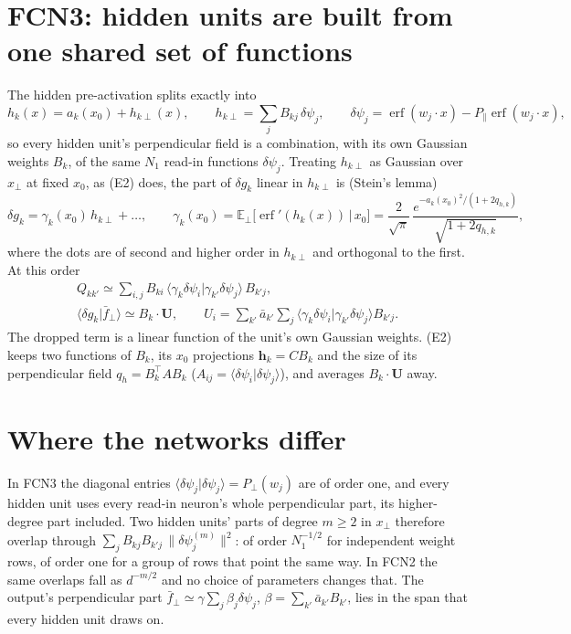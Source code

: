 \documentclass[11pt,a4paper]{article}
\newcommand{\E}{\mathbb E}
\newcommand{\erf}{\operatorname{erf}}
\begin{document}
\section*{FCN3: hidden units are built from one shared set of functions}

The hidden pre-activation splits exactly into
\begin{equation}
  h_k(x)=a_k(x_0)+h_{k\perp}(x),\qquad h_{k\perp}=\sum_jB_{kj}\,\delta\psi_j,\qquad
  \delta\psi_j=\erf(w_j\cdot x)-P_\parallel\erf(w_j\cdot x),
\end{equation}
so every hidden unit's perpendicular field is a combination, with its own Gaussian weights $B_k$, of the same $N_1$
read-in functions $\delta\psi_j$. Treating $h_{k\perp}$ as Gaussian over $x_\perp$ at fixed $x_0$, as (E2) does, the part
of $\delta g_k$ linear in $h_{k\perp}$ is (Stein's lemma)
\begin{equation}
  \delta g_k=\gamma_k(x_0)\,h_{k\perp}+\dots,\qquad
  \gamma_k(x_0)=\E_\perp\big[\erf'(h_k(x))\,\big|\,x_0\big]
  =\frac{2}{\sqrt\pi}\,\frac{e^{-a_k(x_0)^2/(1+2q_{h,k})}}{\sqrt{1+2q_{h,k}}},
\end{equation}
where the dots are of second and higher order in $h_{k\perp}$ and orthogonal to the first. At this order
\begin{gather}
  Q_{kk'}\simeq\sum_{i,j}B_{ki}\,\big\langle\gamma_k\delta\psi_i\big|\gamma_{k'}\delta\psi_j\big\rangle\,B_{k'j},\\
  \big\langle\delta g_k\big|\bar f_\perp\big\rangle\simeq B_k\cdot\mathbf U,\qquad
  U_i=\sum_{k'}\bar a_{k'}\sum_j\big\langle\gamma_k\delta\psi_i\big|\gamma_{k'}\delta\psi_j\big\rangle B_{k'j}.
\end{gather}
The dropped term is a linear function of the unit's own Gaussian weights. (E2) keeps two functions of $B_k$, its
$x_0$ projections $\mathbf h_k=CB_k$ and the size of its perpendicular field $q_h=B_k^\top AB_k$
($A_{ij}=\langle\delta\psi_i|\delta\psi_j\rangle$), and averages $B_k\cdot\mathbf U$ away.

\section*{Where the networks differ}

In FCN3 the diagonal entries $\langle\delta\psi_j|\delta\psi_j\rangle=P_\perp(w_j)$ are of order one, and every hidden
unit uses every read-in neuron's whole perpendicular part, its higher-degree part included. Two hidden units' parts of
degree $m\ge2$ in $x_\perp$ therefore overlap through $\sum_jB_{kj}B_{k'j}\,\|\delta\psi_j^{(m)}\|^2$: of order
$N_1^{-1/2}$ for independent weight rows, of order one for a group of rows that point the same way. In FCN2 the same
overlaps fall as $d^{-m/2}$ and no choice of parameters changes that. The output's perpendicular part
$\bar f_\perp\simeq\gamma\sum_j\beta_j\delta\psi_j$, $\beta=\sum_{k'}\bar a_{k'}B_{k'}$, lies in the span that every hidden
unit draws on.
\end{document}
